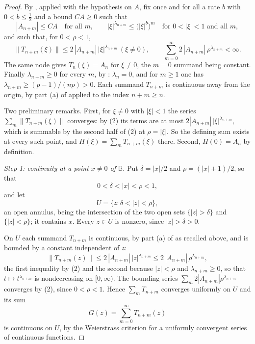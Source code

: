 \begin{proof}
By , applied with the hypothesis on $A$,
fix once and for all a rate $b$ with $0<b\le\tfrac12$ and a bound $CA\ge0$ such
that
\begin{equation}\tag{1}
  |A_{n+m}|\le CA\quad\text{for all }m,
  \qquad
  |\xi|^{\lambda_{n+m}}\le\bigl(|\xi|^{b}\bigr)^{m}
    \quad\text{for }0<|\xi|<1\text{ and all }m,
\end{equation}
and such that, for $0<\rho<1$,
\begin{equation}\tag{2}
  \|T_{n+m}(\xi)\|\le2\,|A_{n+m}|\,|\xi|^{\lambda_{n+m}}\ (\xi\ne0),
  \qquad
  \sum_{m=0}^\infty2\,|A_{n+m}|\,\rho^{\lambda_{n+m}}<\infty .
\end{equation}
The same node gives $T_n(\xi)=A_n$ for $\xi\ne0$, the $m=0$ summand being
constant.  Finally $\lambda_{n+m}\ge0$ for every $m$, by
: $\lambda_n=0$, and for $m\ge1$ one has
$\lambda_{n+m}\ge(p-1)/(np)>0$.  Each summand $T_{n+m}$ is continuous away
from the origin, by part (a) of  applied to the
index $n+m\ge n$.

Two preliminary remarks.  First, for $\xi\ne0$ with $|\xi|<1$ the series
$\sum_m\|T_{n+m}(\xi)\|$ converges: by (2) its terms are at most
$2|A_{n+m}|\,|\xi|^{\lambda_{n+m}}$, which is summable by the second half of
(2) at $\rho=|\xi|$.  So the defining sum exists at every such point, and
$H(\xi)=\sum_mT_{n+m}(\xi)$ there.  Second, $H(0)=A_n$ by definition.

\emph{Step 1: continuity at a point $x\ne0$ of $\mathbb{B}$.}  Put
$\delta=|x|/2$ and $\rho=(|x|+1)/2$, so that
\[
  0<\delta<|x|<\rho<1 ,
\]
and let
\[
  U=\bigl\{z:\delta<|z|<\rho\bigr\},
\]
an open annulus, being the intersection of the two open sets $\{|z|>\delta\}$
and $\{|z|<\rho\}$; it contains $x$.  Every $z\in U$ is nonzero, since
$|z|>\delta>0$.

On $U$ each summand $T_{n+m}$ is continuous, by part (a) of
 as recalled above, and is bounded by a constant
independent of $z$:
\[
  \|T_{n+m}(z)\|\le2\,|A_{n+m}|\,|z|^{\lambda_{n+m}}
  \le2\,|A_{n+m}|\,\rho^{\lambda_{n+m}},
\]
the first inequality by (2) and the second because $|z|<\rho$ and
$\lambda_{n+m}\ge0$, so that $t\mapsto t^{\lambda_{n+m}}$ is nondecreasing on
$[0,\infty)$.  The bounding series $\sum_m2|A_{n+m}|\rho^{\lambda_{n+m}}$
converges by (2), since $0<\rho<1$.  Hence
$\sum_mT_{n+m}$ converges uniformly on $U$ and its sum
\[
  G(z)=\sum_{m=0}^\infty T_{n+m}(z)
\]
is continuous on $U$, by the Weierstrass criterion for a uniformly convergent
series of continuous functions.


\end{proof}
